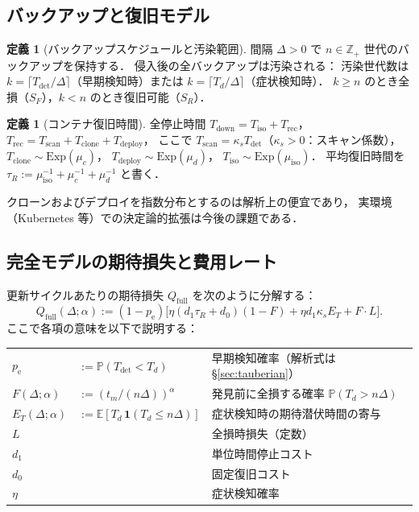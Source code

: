 \documentclass[12pt,a4paper]{article}
\theoremstyle{plain}
\theoremstyle{definition}
\newtheorem{definition}[theorem]{定義}
\theoremstyle{remark}
\newcommand{\E}{\mathbb{E}}
\newcommand{\Prob}{\mathbb{P}}
\newcommand{\Z}{\mathbb{Z}}
\newcommand{\pe}{p_{\mathrm{e}}}
\newcommand{\Qf}{Q_{\mathrm{full}}}
\newcommand{\Tdet}{T_{\mathrm{det}}}
\newcommand{\Trec}{T_{\mathrm{rec}}}
\newcommand{\Tdown}{T_{\mathrm{down}}}
\begin{document}
\subsection{バックアップと復旧モデル}

\begin{definition}[バックアップスケジュールと汚染範囲]\label{def:backup}
間隔 $\Delta>0$ で $n\in\Z_+$ 世代のバックアップを保持する．
侵入後の全バックアップは汚染される：
汚染世代数は $k=\lceil\Tdet/\Delta\rceil$（早期検知時）または $k=\lceil T_d/\Delta\rceil$（症状検知時）．
$k\ge n$ のとき全損（$S_F$），$k<n$ のとき復旧可能（$S_R$）．
\end{definition}

\begin{definition}[コンテナ復旧時間]\label{def:recovery}
全停止時間 $\Tdown=T_{\mathrm{iso}}+\Trec$，
$\Trec=T_{\mathrm{scan}}+T_{\mathrm{clone}}+T_{\mathrm{deploy}}$，
ここで $T_{\mathrm{scan}}=\kappa_s\Tdet$（$\kappa_s>0$：スキャン係数），
$T_{\mathrm{clone}}\sim\mathrm{Exp}(\mu_c)$，
$T_{\mathrm{deploy}}\sim\mathrm{Exp}(\mu_d)$，
$T_{\mathrm{iso}}\sim\mathrm{Exp}(\mu_{\mathrm{iso}})$．
平均復旧時間を $\tau_R:=\mu_{\mathrm{iso}}^{-1}+\mu_c^{-1}+\mu_d^{-1}$ と書く．

クローンおよびデプロイを指数分布とするのは解析上の便宜であり，
実環境（Kubernetes 等）での決定論的拡張は今後の課題である．
\end{definition}

\subsection{完全モデルの期待損失と費用レート}

更新サイクルあたりの期待損失 $\Qf$ を次のように分解する：
\begin{equation}\label{eq:Qfull}
\Qf(\Delta;\alpha)
:=(1-\pe)\bigl[\eta(d_1\tau_R+d_0)(1-F)+\eta d_1\kappa_s E_T+F\cdot L\bigr].
\end{equation}
ここで各項の意味を以下で説明する：

\medskip
\begin{tabular}{@{}ll p{88mm}@{}}
$\pe$ & $:=\Prob(\Tdet<T_d)$ & 早期検知確率（解析式は \S\ref{sec:tauberian}）\\
$F(\Delta;\alpha)$ & $:=(t_m/(n\Delta))^\alpha$ & 発見前に全損する確率 $\Prob(T_d>n\Delta)$ \\
$E_T(\Delta;\alpha)$ & $:=\E[T_d\,\mathbf{1}(T_d\le n\Delta)]$ & 症状検知時の期待潜伏時間の寄与 \\
$L$ & & 全損時損失（定数）\\
$d_1$ & & 単位時間停止コスト\\
$d_0$ & & 固定復旧コスト\\
$\eta$ & & 症状検知確率\\
\end{tabular}
\end{document}
